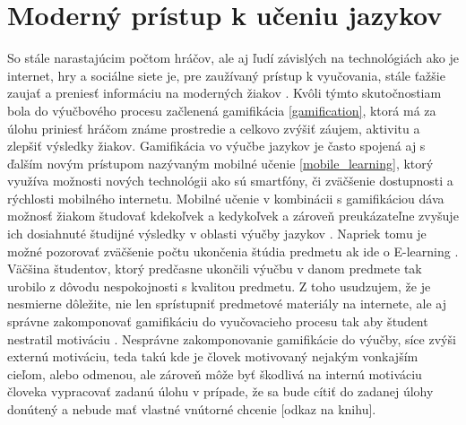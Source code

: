 \documentclass[10pt,slovak,a4paper]{article}
\begin{document}
\newpage
\section{Moderný prístup k učeniu jazykov} \label{new_language_learning}

So stále narastajúcim počtom hráčov, ale aj ľudí závislých na technológiách ako je internet, hry a sociálne siete je, pre zaužívaný prístup k vyučovania, stále ťažšie zaujať a preniesť informáciu na moderných žiakov \cite{Hou_Xiong_Jiang_Song_Wang_2019}.
Kvôli týmto skutočnostiam bola do výučbového procesu začlenená gamifikácia \ref{gamification}, ktorá má za úlohu priniesť hráčom známe prostredie a celkovo zvýšiť záujem, aktivitu a zlepšiť výsledky žiakov. Gamifikácia vo výučbe jazykov je často spojená aj s ďalším novým prístupom nazývaným mobilné učenie \ref{mobile_learning}, ktorý využíva možnosti nových technológii ako sú smartfóny, či zväčšenie dostupnosti a rýchlosti mobilného internetu.
Mobilné učenie v kombinácii s gamifikáciou dáva možnosť žiakom študovať kdekoľvek a kedykoľvek a zároveň preukázateľne zvyšuje ich dosiahnuté študijné výsledky v oblasti výučby jazykov \cite{dehganzadeh2020investigating}.
Napriek tomu je možné pozorovať zväčšenie počtu ukončenia štúdia predmetu ak ide o E-learning \cite{LEVY2007185}. Väčšina študentov, ktorý predčasne ukončili výučbu v danom predmete tak urobilo z dôvodu nespokojnosti s kvalitou predmetu. Z toho usudzujem, že je nesmierne dôležite, nie len sprístupniť predmetové materiály na internete, ale aj správne zakomponovať gamifikáciu do vyučovacieho procesu tak aby študent nestratil motiváciu \cite{HarveCuadr2020h0}.
Nesprávne zakomponovanie gamifikácie do výučby, síce zvýši externú motiváciu, teda takú kde je človek motivovaný nejakým vonkajším cieľom, alebo odmenou,
ale zároveň môže byť škodlivá na internú motiváciu človeka vypracovať zadanú úlohu v prípade, že sa bude cítiť do zadanej úlohy donútený a nebude mať vlastné vnútorné chcenie [odkaz na knihu].

\end{document}
